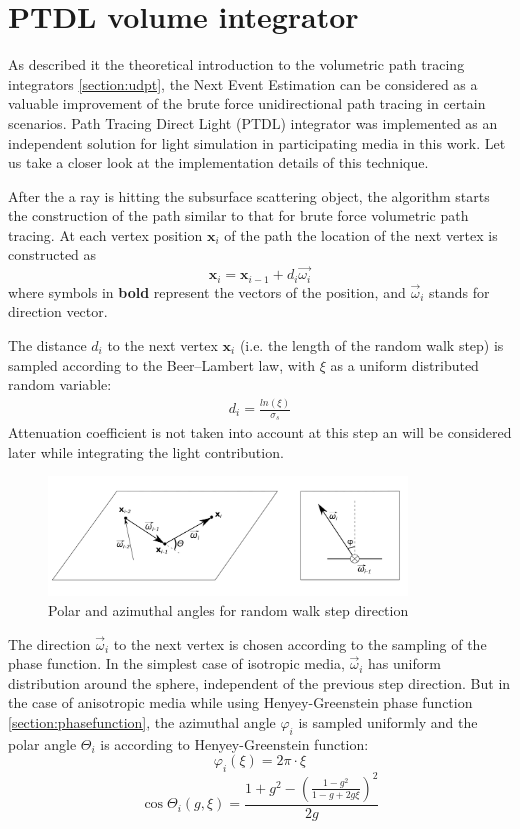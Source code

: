 \section{PTDL volume integrator}
\label{section:ptdl_implement}
As described it the theoretical introduction to the volumetric path tracing integrators
\ref{section:udpt}, the Next Event Estimation can be considered as a valuable improvement of the
brute force unidirectional path tracing in certain scenarios. Path Tracing Direct Light (\gls{PTDL})
integrator was implemented as an independent solution for light simulation in participating media in
this work. Let us take a closer look at the implementation details of this technique.

After the a ray is hitting the subsurface scattering object, the algorithm starts the construction
of the path similar to that for brute force volumetric path tracing. At each vertex position
$\mathbf{x}_i$ of the path the location of the next vertex is constructed as
\[
\mathbf{x}_{i}=\mathbf{x}_{i-1}+d_i\vec{\omega_i}
\]
where symbols in \textbf{bold} represent the vectors of the position, and $\vec{\omega}_i$ stands
for direction vector.

The distance $d_i$ to the next vertex $\mathbf{x}_{i}$ (i.e. the length of the random walk
step) is sampled according to the Beer--Lambert law, with $\xi$ as a uniform distributed random
variable:
\begin{align}
\label{eq:beers_lambert_sampling}
d_i = \frac{ln(\xi)}{\sigma_s}
\end{align}
Attenuation coefficient is not taken into account at this step an will be considered later while
integrating the light contribution.

\begin{figure}[h]
    \centering
    \includegraphics[width=0.85\textwidth]{imgs/schemes/omega}
    \caption{Polar and azimuthal angles for random walk step direction}
    \label{fig:omega}
\end{figure}

The direction $\vec{\omega}_i$ to the next vertex is chosen according to the sampling of the
phase function. In the simplest case of isotropic media, $\vec{\omega}_i$ has uniform distribution
around the sphere, independent of the previous step direction.
But in the case of anisotropic media while using Henyey-Greenstein phase function 
\ref{section:phasefunction}, the azimuthal angle $\varphi_i$ is sampled uniformly and the polar
angle $\Theta_i$ is according to Henyey-Greenstein function:
\[
\varphi_i(\xi)=2\pi\cdot\xi
\]
\begin{equation}
\label{eq:hg_sampling}
\cos{\Theta_i}(g, \xi) = \frac{1+g^2-(\frac{1-g^2}{1-g+2g\xi})^2}{2g} 
\end{equation}

